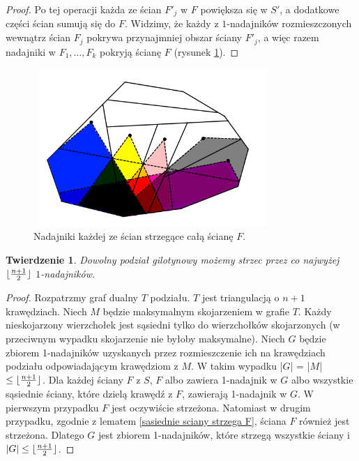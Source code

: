 \documentclass[brudnopis]{xmgr}
\DeclarePairedDelimiter\floor{\lfloor}{\rfloor}
\newtheorem{Twierdzenie}{Twierdzenie}
\theoremstyle{definition}
\begin{document}
\begin{proof}
Po tej operacji każda ze ścian $F'_j$ w $F$ powiększa się w $S'$, a dodatkowe części ścian sumują się do $F$. Widzimy, że każdy z $1$-nadajników rozmieszczonych wewnątrz ścian $F_j$ pokrywa przynajmniej obszar ściany $F'_j$, a więc razem nadajniki w $F_1,\ldots,F_k$ pokryją ścianę $F$ (rysunek \ref{fig:pokrycie f}).
\end{proof}

\begin{figure}[ht!]
  \centering
  \includegraphics[width=9cm,height=6cm]{rysunki/pokrycie_f.png}
  \caption{Nadajniki każdej ze ścian strzegące całą ścianę $F$.}
  \label{fig:pokrycie f}
\end{figure} 

\begin{Twierdzenie} \cite{knadajniki}
  Dowolny podział gilotynowy możemy strzec przez co najwyżej $\floor{\frac{n+1}{2}}$ $1$-nadajników.
\end{Twierdzenie}
\begin{proof}
	Rozpatrzmy graf dualny $T$ podziału. $T$ jest triangulacją o $n + 1$ krawędziach. Niech $M$ będzie maksymalnym skojarzeniem w grafie $T$. Każdy nieskojarzony wierzchołek jest sąsiedni tylko do wierzchołków skojarzonych (w przeciwnym wypadku skojarzenie nie byłoby maksymalne). Niech $G$ będzie zbiorem 1-nadajników uzyskanych przez rozmieszczenie ich na krawędziach podziału odpowiadającym krawędziom z $M$. W takim wypadku |$G$| = |$M$| $\le \floor{\frac{n+1}{2}}$. Dla każdej ściany $F$ z $S$, $F$ albo zawiera 1-nadajnik w $G$ albo wszystkie sąsiednie ściany, które dzielą krawędź z $F$, zawierają 1-nadajnik w $G$. W pierwszym przypadku $F$ jest oczywiście strzeżona. Natomiast w drugim przypadku, zgodnie z lematem \ref{sasiednie sciany strzega F}, ściana $F$ również jest strzeżona. Dlatego $G$ jest zbiorem 1-nadajników, które strzegą wszystkie ściany i $|G| \le \floor{\frac{n+1}{2}}$.
\end{proof}
\end{document}

